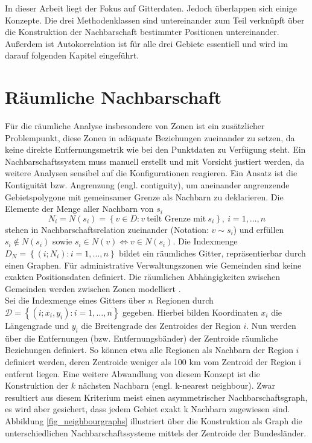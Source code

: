 In dieser Arbeit liegt der Fokus auf Gitterdaten. Jedoch überlappen sich einige Konzepte. 
Die drei Methodenklassen sind untereinander zum Teil verknüpft über die Konstruktion der 
Nachbarschaft bestimmter Positionen untereinander. 
Außerdem ist Autokorrelation ist für alle drei Gebiete essentiell und wird im darauf folgenden Kapitel eingeführt.

\section{Räumliche Nachbarschaft}
\label{ch:classification-neighbours}


Für die räumliche Analyse insbesondere von Zonen ist ein zusätzlicher Problempunkt, diese Zonen in adäquate Beziehungen zueinander zu setzen, da keine direkte Entfernungsmetrik wie bei
den Punktdaten zu Verfügung steht. Ein Nachbarschaftssystem muss manuell erstellt und mit Vorsicht justiert werden, da weitere Analysen sensibel auf die Konfigurationen reagieren.
Ein Ansatz ist die Kontiguität bzw. Angrenzung (engl. contiguity), um aneinander angrenzende Gebietspolygone mit gemeinsamer Grenze als Nachbarn zu deklarieren. 
Die Elemente der Menge aller Nachbarn von $s_i$
\begin{equation*}
    N_i = N(s_i)=\left\{ v \in D: v ~ \text{teilt Grenze mit} ~ s_i \right\} , ~ i=1,\ldots,n
\end{equation*}
stehen in Nachbarschaftsrelation zueinander (Notation: $v \sim s_i$) und erfüllen 
$s_i \notin N(s_i)$ sowie
$s_i \in N(v) \Leftrightarrow v \in N(s_i)$.
Die Indexmenge
$D_N= \left\{ (i; N_i):i=1,\ldots,n  \right\} $
bildet ein räumliches Gitter, repräsentierbar durch einen Graphen. 
Für administrative Verwaltungszonen wie Gemeinden sind keine exakten Positionsdaten definiert. Die räumlichen Abhängigkeiten zwischen Gemeinden werden zwischen Zonen modelliert \cite[S. 385]{cressie_statistics_1993}.\\


Sei die Indexmenge eines Gitters über $n$ Regionen durch $ \mathcal{D} =\left\{  \left({i;x_i,y_i} \right):i=1,\ldots,n \right\}$
gegeben. Hierbei bilden Koordinaten $x_i$ die Längengrade und $y_i$ die Breitengrade des Zentroides der Region $i$. 
Nun werden über die Entfernungen (bzw. Entfernungsbänder) der Zentroide räumliche Beziehungen definiert. 
So können etwa alle Regionen als Nachbarn der Region $i$ definiert werden, deren Zentroide weniger als 100 km vom Zentroid der Region i entfernt liegen.
Eine weitere Abwandlung von diesem Konzept ist die Konstruktion der $k$ nächsten Nachbarn (engl. k-nearest neighbour). 
Zwar resultiert aus diesem Kriterium meist einen asymmetrischer Nachbarschaftsgraph, es wird aber gesichert, dass jedem Gebiet exakt k Nachbarn zugewiesen sind.
Abbildung \ref{fig_neighbourgraphs} illustriert über die Konstruktion als Graph die unterschiedlichen 
Nachbarschaftssysteme mittels der Zentroide der Bundesländer.

